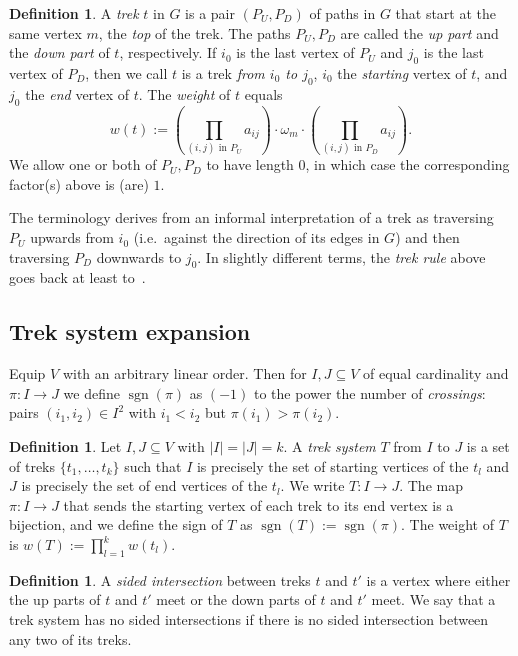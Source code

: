 \documentclass[10pt]{amsart}
\theoremstyle{definition}
\newtheorem{defi}[theo]{Definition}
\providecommand{\ie}{i.e.\ }
\DeclareMathOperator{\sgn}{sgn}
\begin{document}
\begin{defi}
A \emph{trek} $t$ in $G$ is a pair $(P_U,P_D)$ of paths in $G$ that start at the same vertex $m$, the \emph{top} of the trek. The paths $P_U,P_D$ are called the \emph{up part} and the \emph{down part} of $t$, respectively. If $i_0$ is the last vertex of $P_U$ and $j_0$ is the last vertex of $P_D$, then we call $t$ is a trek \emph{from $i_0$ to $j_0$}, $i_0$ the \emph{starting} vertex of $t$, and $j_0$ the \emph{end} vertex of $t$. The \emph{weight} of $t$ equals
\[
w(t):= \left(\prod_{(i,j) \text{ in } P_U} a_{ij} \right) \cdot \omega_m \cdot
\left(\prod_{(i,j) \text{ in } P_D} a_{ij} \right).
\]
We allow one or both of $P_U,P_D$ to have length $0$, in which case the corresponding factor(s) above is (are) $1$.
\end{defi}

The terminology derives from an informal interpretation of a trek as traversing $P_U$ upwards from $i_0$ (\ie against the direction of its edges in $G$) and then traversing $P_D$ downwards to $j_0$. In slightly different terms, the \emph{trek rule} above goes back at least to~\cite{Wright34}.

\subsection*{Trek system expansion}

Equip $V$ with an arbitrary linear order. Then for $I,J \subseteq V$ of equal cardinality and $\pi:I \to J$ we define $\sgn(\pi)$ as $(-1)$ to the power the number of \emph{crossings}: pairs $(i_1,i_2) \in I^2$ with $i_1<i_2$ but $\pi(i_1)>\pi(i_2)$.

\begin{defi}
Let $I,J \subseteq V$ with $|I|=|J|=k$. A \emph{trek system} $T$ from $I$ to $J$ is a set of treks $\{t_1,\ldots,t_k\}$ such that $I$ is precisely the set of starting vertices of the $t_l$ and $J$ is precisely the set of end vertices of the $t_l$. We write $T:I \to J$. The map $\pi:I \to J$ that sends the starting vertex of each trek to its end vertex is a bijection, and we define the sign of $T$ as $\sgn(T):=\sgn(\pi)$. The weight of $T$ is $w(T):=\prod_{l=1}^k w(t_l)$.
\end{defi}

\begin{defi}
A \emph{sided intersection} between treks $t$ and $t'$ is a vertex where either the up parts of $t$ and $t'$ meet or the down parts of $t$ and $t'$ meet. We say that a trek system has no sided intersections if there is no sided intersection between any two of its treks.
\end{defi}
\end{document}
